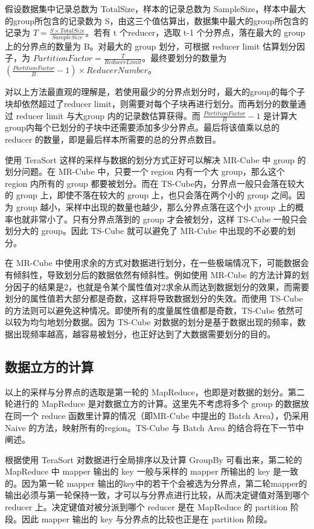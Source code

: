 假设数据集中记录总数为 TotalSize，样本的记录总数为 SampleSize，样本中最大的group所包含的记录数为 S，由这三个值估算出，数据集中最大的group所包含的记录为 $T = \frac{S\times TotalSize}{SampleSize}$。若有 t 个reducer，选取 t-1 个分界点，落在最大的 group 上的分界点的数量为 B。对最大的 group 划分，可根据 reducer limit 估算划分因子，为 $PartitionFactor = \frac{T}{ReducerLimit}$。最终要划分的数量为 $\left( \frac {PartitionFactor}{B} - 1 \right) \times ReducerNumber$。

对以上方法最直观的理解是，若使用最少的分界点划分时，最大的group的每个子块却依然超过了reducer limit，则需要对每个子块再进行划分。而再划分的数量通过 reducer limit 与大group 内的记录数估算获得。而 $\frac {PartitionFactor}{B} - 1 $ 是计算大group内每个已划分的子块中还需要添加多少分界点。最后将该值乘以总的 reducer 的数量，即是最后样本所需要的总的分界点数目。


使用 TeraSort 这样的采样与数据的划分方式正好可以解决 MR-Cube 中 group 的划分问题。在 MR-Cube 中，只要一个 region 内有一个大 group，那么这个 region 内所有的 group 都要被划分。而在 TS-Cube内，分界点一般只会落在较大的 group 上，即使不落在较大的 group 上，也只会落在两个小的 group 之间。因为 group 越小，采样中出现的数量也越少，那么分界点落在这个小 group 上的概率也就非常小了。只有分界点落到的 group 才会被划分，这样 TS-Cube 一般只会划分大的 group。因此 TS-Cube 就可以避免了 MR-Cube 中出现的不必要的划分。

在 MR-Cube 中使用求余的方式对数据进行划分，在一些极端情况下，可能数据会有倾斜性，导致划分后的数据依然有倾斜性。例如使用 MR-Cube 的方法计算的划分因子的结果是2，也就是令某个属性值对2求余从而达到数据划分的效果，而需要划分的属性值若大部分都是奇数，这样将导致数据划分的失效。而使用 TS-Cube 的方法则可以避免这种情况。即使所有的度量属性值都是奇数，TS-Cube 依然可以较为均匀地划分数据。因为 TS-Cube 对数据的划分是基于数据出现的频率，数据出现频率越高，越容易被划分，也正好达到了大数据需要划分的目的。

\subsection{数据立方的计算}

以上的采样与分界点的选取是第一轮的 MapReduce，也即是对数据的划分。第二轮进行的 MapReduce 是对数据立方的计算。这里先不考虑将多个 group 的数据放在同一个 reduce 函数里计算的情况（即MR-Cube 中提出的 Batch Area），仍采用 Naive 的方法，映射所有的region。TS-Cube 与 Batch Area 的结合将在下一节中阐述。

根据使用 TeraSort 对数据进行全局排序以及计算 GroupBy 可看出来，第二轮的 MapReduce 中 mapper 输出的 key 一般与采样的 mapper 所输出的 key 是一致的。因为第一轮 mapper 输出的key中的若干个会被选为分界点，第二轮mapper的输出必须与第一轮保持一致，才可以与分界点进行比较，从而决定键值对落到哪个 reducer 上。决定键值对被分派到哪个 reducer 是在 MapReduce 的 partition 阶段。因此 mapper 输出的 key 与分界点的比较也正是在 partition 阶段。

